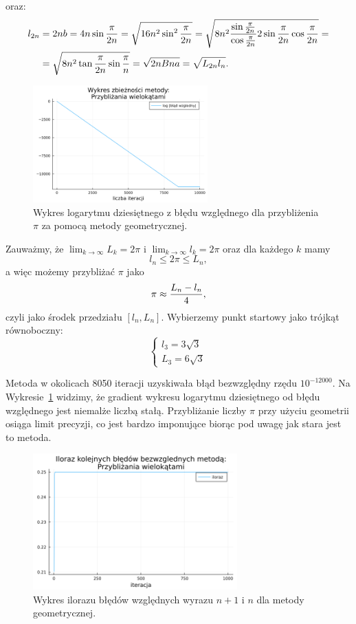 oraz:
\begin{align*}
    l_{2n}&=2nb=4n\sin{\pi\over 2n}=\sqrt{16n^2\sin^2{\pi\over 2n}}=\sqrt{8n^2{\sin{\pi\over2n}\over\cos{\pi\over 2n}}2\sin{\pi\over 2n}\cos{\pi\over 2n}}=\\
    &=\sqrt{8n^2\tan{\pi\over 2n}\sin{\pi\over n}}=\sqrt{2nBna}=\sqrt{L_{2n}l_n}.
\end{align*}
\begin{figure}[!h]\centering
    \renewcommand{\figurename}{Wykres}
    \includegraphics[width=0.6\textwidth]{../prog/geo3_log_error.png}
    \caption{Wykres logarytmu dziesiętnego z błędu względnego dla przybliżenia $\pi$ za pomocą metody geometrycznej.}
    \label{geometric-error}
\end{figure}

Zauważmy, że $\lim_{k\to\infty}L_k=2\pi$ i $\lim_{k\to\infty}l_k=2\pi$ oraz dla każdego $k$ mamy
$$l_n\leq 2\pi\leq L_n,$$
a więc możemy przybliżać $\pi$ jako
$$\pi\approx{L_n-l_n\over 4},$$
czyli jako środek przedziału $[l_n,L_n]$. Wybierzemy punkt startowy jako trójkąt równoboczny:
$$\begin{cases}
    l_3=3\sqrt3\\
    L_3=6\sqrt3
\end{cases}$$

Metoda w okolicach 8050 iteracji uzyskiwała błąd bezwzględny rzędu $10^{-12000}$. Na Wykresie~\ref{geometric-error} widzimy, że gradient wykresu logarytmu dziesiętnego od błędu względnego jest niemalże liczbą stałą. Przybliżanie liczby $\pi$ przy użyciu geometrii osiąga limit precyzji, co jest bardzo imponujące biorąc pod uwagę jak stara jest to metoda.

\begin{figure}[!h]\centering
    \renewcommand{\figurename}{Wykres}
    \includegraphics[width=0.7\textwidth]{../prog/geo3_error_ratio.png}
    \caption{Wykres ilorazu błędów względnych wyrazu $n+1$ i $n$ dla metody geometrycznej.}
    \label{geometric-convergence}
\end{figure}

